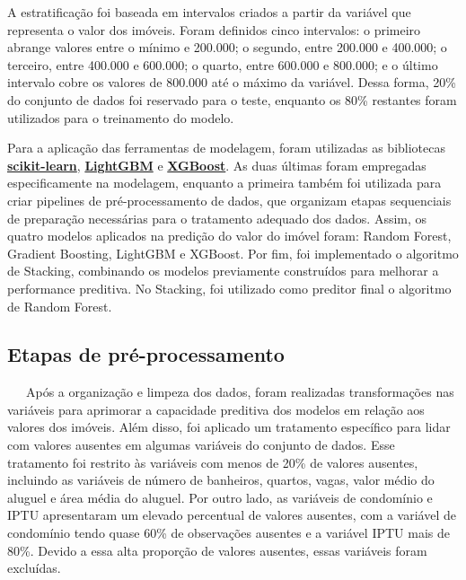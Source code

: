 \documentclass[
  12pt,
  a4paper,
]{scrreprt}
\begin{document}
A estratificação foi baseada em intervalos criados a partir da variável
que representa o valor dos imóveis. Foram definidos cinco intervalos: o
primeiro abrange valores entre o mínimo e 200.000; o segundo, entre
200.000 e 400.000; o terceiro, entre 400.000 e 600.000; o quarto, entre
600.000 e 800.000; e o último intervalo cobre os valores de 800.000 até
o máximo da variável. Dessa forma, 20\% do conjunto de dados foi
reservado para o teste, enquanto os 80\% restantes foram utilizados para
o treinamento do modelo.

\vspace{12pt}

Para a aplicação das ferramentas de modelagem, foram utilizadas as
bibliotecas
\href{https://scikit-learn.org/stable/}{\textbf{scikit-learn}},
\href{https://lightgbm.readthedocs.io/en/stable/}{\textbf{LightGBM}} e
\href{https://xgboost.readthedocs.io/en/stable/}{\textbf{XGBoost}}. As
duas últimas foram empregadas especificamente na modelagem, enquanto a
primeira também foi utilizada para criar pipelines de pré-processamento
de dados, que organizam etapas sequenciais de preparação necessárias
para o tratamento adequado dos dados. Assim, os quatro modelos aplicados
na predição do valor do imóvel foram: Random Forest, Gradient Boosting,
LightGBM e XGBoost. Por fim, foi implementado o algoritmo de Stacking,
combinando os modelos previamente construídos para melhorar a
performance preditiva. No Stacking, foi utilizado como preditor final o
algoritmo de Random Forest.

\subsection{Etapas de
pré-processamento}\label{etapas-de-pruxe9-processamento}

~~~Após a organização e limpeza dos dados, foram realizadas
transformações nas variáveis para aprimorar a capacidade preditiva dos
modelos em relação aos valores dos imóveis. Além disso, foi aplicado um
tratamento específico para lidar com valores ausentes em algumas
variáveis do conjunto de dados. Esse tratamento foi restrito às
variáveis com menos de 20\% de valores ausentes, incluindo as variáveis
de número de banheiros, quartos, vagas, valor médio do aluguel e área
média do aluguel. Por outro lado, as variáveis de condomínio e IPTU
apresentaram um elevado percentual de valores ausentes, com a variável
de condomínio tendo quase 60\% de observações ausentes e a variável IPTU
mais de 80\%. Devido a essa alta proporção de valores ausentes, essas
variáveis foram excluídas.
\end{document}
